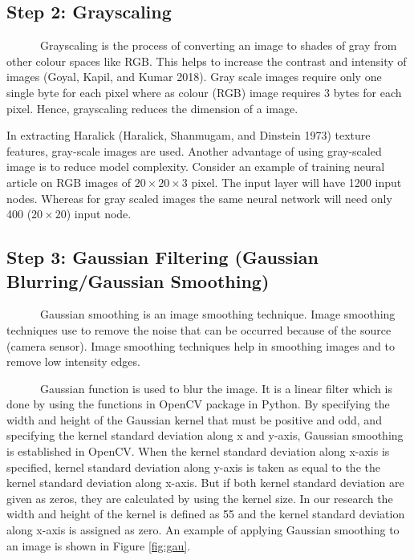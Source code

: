 \documentclass{article}
\begin{document}
\hypertarget{step-2-grayscaling}{%
\subsection{Step 2: Grayscaling}\label{step-2-grayscaling}}

~~~~~~Grayscaling is the process of converting an image to shades of
gray from other colour spaces like RGB. This helps to increase the
contrast and intensity of images (Goyal, Kapil, and Kumar 2018). Gray
scale images require only one single byte for each pixel where as colour
(RGB) image requires 3 bytes for each pixel. Hence, grayscaling reduces
the dimension of a image.

In extracting Haralick (Haralick, Shanmugam, and Dinstein 1973) texture
features, gray-scale images are used. Another advantage of using
gray-scaled image is to reduce model complexity. Consider an example of
training neural article on RGB images of \(20 \times 20 \times 3\)
pixel. The input layer will have 1200 input nodes. Whereas for gray
scaled images the same neural network will need only 400
(\(20 \times 20\)) input node.

\hypertarget{step-3-gaussian-filtering-gaussian-blurringgaussian-smoothing}{%
\subsection{Step 3: Gaussian Filtering (Gaussian Blurring/Gaussian
Smoothing)}\label{step-3-gaussian-filtering-gaussian-blurringgaussian-smoothing}}

~~~~~~Gaussian smoothing is an image smoothing technique. Image
smoothing techniques use to remove the noise that can be occurred
because of the source (camera sensor). Image smoothing techniques help
in smoothing images and to remove low intensity edges.

~~~~~~Gaussian function is used to blur the image. It is a linear filter
which is done by using the functions in OpenCV package in Python. By
specifying the width and height of the Gaussian kernel that must be
positive and odd, and specifying the kernel standard deviation along x
and y-axis, Gaussian smoothing is established in OpenCV. When the kernel
standard deviation along x-axis is specified, kernel standard deviation
along y-axis is taken as equal to the the kernel standard deviation
along x-axis. But if both kernel standard deviation are given as zeros,
they are calculated by using the kernel size. In our research the width
and height of the kernel is defined as 55 and the kernel standard
deviation along x-axis is assigned as zero. An example of applying
Gaussian smoothing to an image is shown in Figure \ref{fig:gau}.
\end{document}
